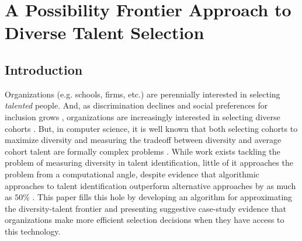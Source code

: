 

\chapter{\label{ch:spf}A Possibility Frontier Approach to Diverse Talent Selection} %

\minitoc

\section{Introduction}
Organizations (e.g. schools, firms, etc.) are perennially interested in selecting \emph{talented} people. And, as discrimination declines \cite{hsieh2019allocation} and social preferences for inclusion grows \cite{minkin2023diversity}, organizations are increasingly interested in selecting diverse cohorts \cite{dwork2012fairness}. But, in computer science, it is well known that both selecting cohorts to maximize diversity and measuring the tradeoff between diversity and average cohort talent are formally complex problems \cite{nemhauser1978analysis, huppenkothen2020entrofy}. While work exists tackling the problem of measuring diversity in talent identification, little of it approaches the problem from a computational angle, despite evidence that algorithmic approaches to talent identification outperform alternative approaches by as much as $50\%$ \cite{kuncel2013mechanical,li2020hiring}. This paper fills this hole by developing an algorithm for approximating the diversity-talent frontier and presenting suggestive case-study evidence that organizations make more efficient selection decisions when they have access to this technology. 

